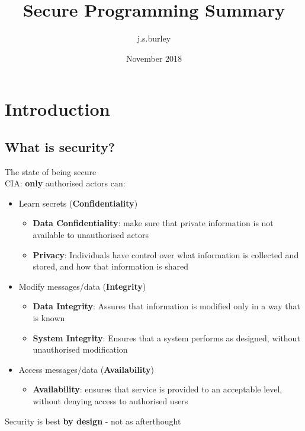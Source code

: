 \documentclass{article}
\title{Secure Programming Summary}
\author{j.s.burley }
\date{November 2018}
\begin{document}
\maketitle

\tableofcontents
\newpage
\section{Introduction}
\subsection{What is security?}
The state of being secure
\\CIA: \textbf{only} authorised actors can:
\begin{itemize}
    \item Learn secrets (\textbf{Confidentiality})
    \begin{itemize}
        \item \textbf{Data Confidentiality}: make sure that private information is not available to unauthorised actors
        \item \textbf{Privacy}: Individuals have control over what information is collected and stored, and how that information is shared
    \end{itemize}
    \item Modify messages/data (\textbf{Integrity})
    \begin{itemize}
        \item \textbf{Data Integrity}: Assures that information is modified only in a way that is known
        \item \textbf{System Integrity}: Ensures that a system performs as designed, without unauthorised modification
    \end{itemize}
    \item Access messages/data (\textbf{Availability})
    \begin{itemize}
        \item \textbf{Availability}: ensures that service is provided to an acceptable level, without denying access to authorised users
    \end{itemize}
\end{itemize}
Security is best \textbf{by design} - not as afterthought
\end{document}
